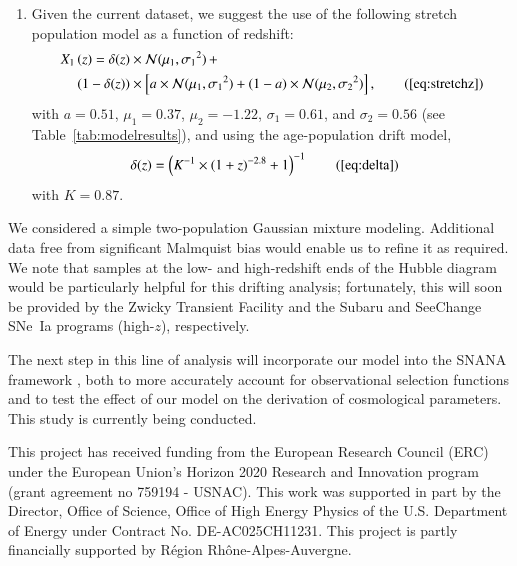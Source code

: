 \documentclass[]{aa}
\begin{document}
\begin{enumerate}
    \item Given the current dataset, we suggest the use of the following stretch
        population model as a function of redshift:
        \begin{align*}
        \label{eqconclusion:stretchz}
            X_1\left(z \right) =
            \delta(z)&\times\mathcal{N}(\mu_1,\sigma_1{}^2)\,+\nonumber\\
            (1-\delta(z))&\times \left[a\times\mathcal{N}(\mu_1,\sigma_1{}^2) +
            (1-a)\times\mathcal{N}(\mu_2,\sigma_2{}^2)\right],
            \tag{\ref{eq:stretchz}}
        \end{align*}
        with $a=0.51$, $\mu_1=0.37$, $\mu_2=-1.22$, $\sigma_1=0.61$, and
        $\sigma_2=0.56$ (see Table~\ref{tab:modelresults}), and using the
        age-population drift model, \begin{align*}
            \delta(z) & = \left( K^{-1} \times (1+z)^{-2.8} +1 \right)^{-1}
            \tag{\ref{eq:delta}}
        \end{align*}
        with $K=0.87$.
\end{enumerate}

We considered a simple two-population Gaussian mixture modeling. Additional data
free from significant Malmquist bias would enable us to refine it as required.
We note that samples at the low- and high-redshift ends of the Hubble diagram
would be particularly helpful for this drifting analysis; fortunately, this will
soon be provided by the Zwicky Transient Facility \citep[low-$z$,][]{bellm2019,
graham2019} and the Subaru and SeeChange SNe~Ia programs (high-$z$),
respectively. 

The next step in this line of analysis will incorporate our model into the SNANA
framework \citep{SNANA}, both to more accurately account for observational
selection functions and to test the effect of our model on the derivation of
cosmological parameters. This study is currently being conducted.

\begin{acknowledgements}
    This project has received funding from the European Research Council (ERC)
    under the European Union's Horizon 2020 Research and Innovation program
    (grant agreement no 759194 - USNAC).
    This work was supported in part by the Director, Office of Science, Office
    of High Energy Physics of the U.S. Department of Energy under Contract No.
    DE-AC025CH11231.
    This project is partly financially supported by Région Rhône-Alpes-Auvergne.
\end{acknowledgements}
\end{document}
